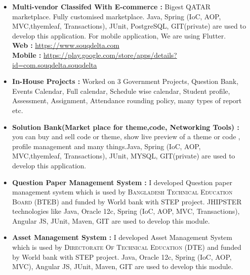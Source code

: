 

\begin{cvparagraph}
	
	\begin{itemize}
	
	
	\item \textbf{Multi-vendor Classifed With E-commerce : } Bigest QATAR marketplace. Fully customised marketplace. Java, Spring (IoC, AOP, MVC,thyemleaf, Transactions), JUnit, PostgreSQL, GIT(private) are used to develop this application. For mobile application, We are using Flutter. \\ \textbf{Web : } \underline{https://www.souqdelta.com} \\ \textbf{Mobile : } \underline{https://play.google.com/store/apps/details?id=com.souqdelta.souq\textunderscore delta}
		
		\item \textbf{In-House Projects : } Worked on 3 Government Projects, Question Bank, Events Calendar, Full calendar, Schedule wise calendar, Student profile, Assessment, Assignment, Attendance rounding policy, many types of report etc.
		
		\item \textbf{Solution Bank(Market place for theme,code, Networking Tools) : }you can buy and sell code or theme, show live preview of a theme or code , profile management and many things.Java, Spring (IoC, AOP, MVC,thyemleaf, Transactions), JUnit, MYSQL, GIT(private) are used to develop this application.
		
		
		\item \textbf{Question Paper Management System : }I developed Question paper management system which is used by \textsc{Bangladesh Technical Education Board (BTEB)} and funded by World bank with STEP project. JHIPSTER technologies like Java, Oracle 12c, Spring (IoC, AOP, MVC, Transactions), Angular JS, JUnit, Maven, GIT are used to develop this module.
		
		
		\item \textbf{Asset Management System :} I developed Asset Management System which is used by \textsc{Directorate Of Technical Education (DTE)} and funded by World bank with STEP project. Java, Oracle 12c, Spring (IoC, AOP, MVC), Angular JS, JUnit, Maven, GIT are used to develop this module.
		

\end{itemize}
\end{cvparagraph}
